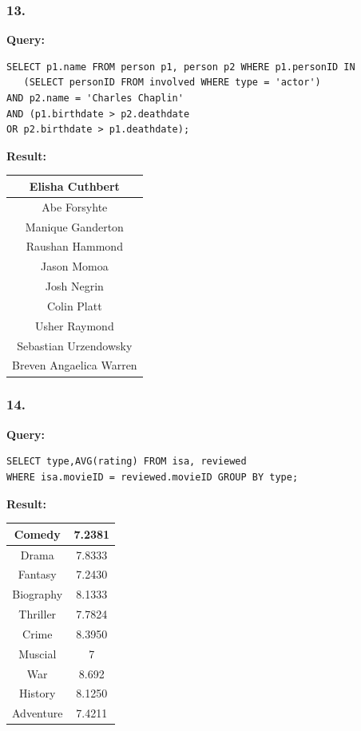 \documentclass[10pt,a4paper,final]{report}
\begin{document}
\subsubsection*{13.}
\textbf{Query:}
\begin{lstlisting}
SELECT p1.name FROM person p1, person p2 WHERE p1.personID IN 
   (SELECT personID FROM involved WHERE type = 'actor') 
AND p2.name = 'Charles Chaplin' 
AND (p1.birthdate > p2.deathdate 
OR p2.birthdate > p1.deathdate);
\end{lstlisting}
\textbf{Result:}

\begin{tabular}{|c|}
\hline Elisha Cuthbert \\ 
\hline Abe Forsyhte \\ 
\hline Manique Ganderton \\ 
\hline Raushan Hammond \\ 
\hline Jason Momoa \\ 
\hline Josh Negrin \\ 
\hline Colin Platt \\ 
\hline Usher Raymond \\ 
\hline Sebastian Urzendowsky \\ 
\hline Breven Angaelica Warren \\ 
\hline 
\end{tabular}

\subsubsection*{14.}
\textbf{Query:}
\begin{lstlisting}
SELECT type,AVG(rating) FROM isa, reviewed 
WHERE isa.movieID = reviewed.movieID GROUP BY type;
\end{lstlisting}
\textbf{Result:}

\begin{tabular}{|c|c|}
\hline 
Comedy & 7.2381 \\ 
\hline 
Drama & 7.8333 \\ 
\hline 
Fantasy & 7.2430 \\ 
\hline 
Biography & 8.1333 \\ 
\hline 
Thriller & 7.7824 \\ 
\hline 
Crime & 8.3950 \\ 
\hline 
Muscial & 7 \\ 
\hline 
War & 8.692 \\ 
\hline 
History & 8.1250 \\ 
\hline 
Adventure & 7.4211 \\ 
\hline 
\end{tabular} 
\end{document}
